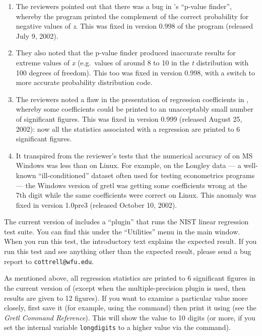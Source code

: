 \begin{enumerate}
\item The reviewers pointed out that there was a bug in 's
  ``p-value finder'', whereby the program printed the complement of
  the correct probability for negative values of \emph{z}.  This was
  fixed in version 0.998 of the program (released July 9, 2002).
\item They also noted that the p-value finder produced inaccurate
  results for extreme values of \emph{x} (e.g.\ values of around 8 to
  10 in the \emph{t} distribution with 100 degrees of freedom).  This
  too was fixed in  version 0.998, with a switch to more
  accurate probability distribution code.
\item The reviewers noted a flaw in the presentation of regression
  coefficients in , whereby some coefficients could be
  printed to an unacceptably small number of significant figures.
  This was fixed in version 0.999 (released August 25, 2002): now all
  the statistics associated with a regression are printed to 6
  significant figures.
\item It transpired from the reviewer's tests that the numerical
  accuracy of  on MS Windows was less than on Linux.  For
  example, on the Longley data --- a well-known ``ill-conditioned''
  dataset often used for testing econometrics programs --- the Windows
  version of gretl was getting some coefficients wrong at the 7th
  digit while the same coefficients were correct on Linux.  This
  anomaly was fixed in  version 1.0pre3 (released October
  10, 2002).
\end{enumerate}

The current version of  includes a ``plugin'' that runs the
NIST linear regression test suite.  You can find this under the
``Utilities'' menu in the main window.  When you run this test, the
introductory text explains the expected result.  If you run this test
and see anything other than the expected result, please send a bug
report to \verb+cottrell@wfu.edu+.  

As mentioned above, all regression statistics are printed to 6
significant figures in the current version of  (except when
the multiple-precision plugin is used, then results are given to 12
figures).  If you want to examine a particular value more closely,
first save it (for example, using the  command) then print
it using  (see the \emph{Gretl Command Reference}).
This will show the value to 10 digits (or more, if you set the
internal variable \texttt{longdigits} to a higher value via the
 command).

